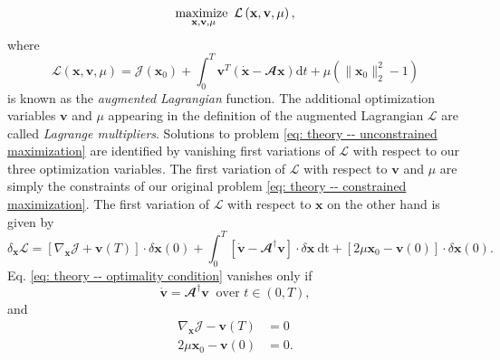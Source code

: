       \begin{equation}
        \maximize \limits_{\mathbf{x}, \mathbf{v}, \mu} \mathcal{L} \left( \mathbf{x}, \mathbf{v}, \mu \right),
        \label{eq: theory -- unconstrained maximization}
      \end{equation}
      where
      \begin{equation}
        \mathcal{L} \left( \mathbf{x}, \mathbf{v}, \mu \right) = \mathcal{J}\left( \mathbf{x}_0 \right) + \int_{0}^T \mathbf{v}^T \left( \dot{\mathbf{x}} - \mathbfcal{A}\mathbf{x} \right) \mathrm{d}t + \mu \left( \| \mathbf{x}_0 \|_2^2 - 1 \right)
        \label{eq: theory -- augmented Lagrangian}
      \end{equation}
      is known as the \emph{augmented Lagrangian} function. The additional optimization variables $\mathbf{v}$ and $\mu$ appearing in the definition of the augmented Lagrangian $\mathcal{L}$ are called \emph{Lagrange multipliers}. Solutions to problem \eqref{eq: theory -- unconstrained maximization} are identified by vanishing first variations of $\mathcal{L}$ with respect to our three optimization variables. The first variation of $\mathcal{L}$ with respect to $\mathbf{v}$ and $\mu$ are simply the constraints of our original problem \eqref{eq: theory -- constrained maximization}. The first variation of $\mathcal{L}$ with respect to $\mathbf{x}$ on the other hand is given by
      \begin{equation}
        \delta_{\mathbf{x}} \mathcal{L} = \left[ \nabla_{\mathbf{x}} \mathcal{J} + \mathbf{v}(T) \right] \cdot \delta \mathbf{x}(0) + \int_0^T \left[ \dot{\mathbf{v}} - \mathbfcal{A}^{\dagger} \mathbf{v} \right] \cdot \delta \mathbf{x} \ \mathrm{dt} + \left[ 2\mu \mathbf{x}_0 - \mathbf{v}(0) \right] \cdot \delta \mathbf{x}(0).
        \label{eq: theory -- optimality condition}
      \end{equation}
      Eq. \eqref{eq: theory -- optimality condition} vanishes only if
      \begin{equation}
        \dot{\mathbf{v}} = \mathbfcal{A}^{\dagger} \mathbf{v} \ \text{ over } t \in \left( 0, T \right),
        \label{eq: theory -- adjoint equations}
      \end{equation}
      and
      \begin{equation}
        \begin{aligned}
          \nabla_{\mathbf{x}} \mathcal{J} - \mathbf{v}(T) & = 0 \\
          2\mu \mathbf{x}_0 - \mathbf{v}(0) & = 0.
        \end{aligned}
        \label{eq: theory -- compatibility conditions}
      \end{equation}
